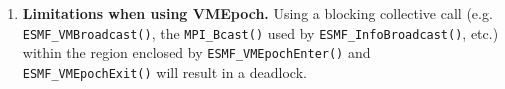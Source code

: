 \begin{enumerate}
\item {\bf Limitations when using VMEpoch.} Using a blocking collective call (e.g. {\tt ESMF\_VMBroadcast()}, the {\tt MPI\_Bcast()} used by {\tt ESMF_InfoBroadcast()}, etc.) within the region enclosed by {\tt ESMF\_VMEpochEnter()} and {\tt ESMF\_VMEpochExit()} will result in a deadlock. 

  
\end{enumerate}


